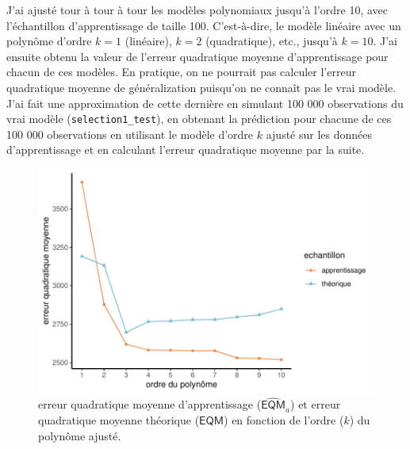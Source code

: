 \documentclass[
  11pt,
  letterpaper,
]{scrbook}
\theoremstyle{definition}
\theoremstyle{remark}
\begin{document}
J'ai ajusté tour à tour à tour les modèles polynomiaux jusqu'à l'ordre
10, avec l'échantillon d'apprentissage de taille 100. C'est-à-dire, le
modèle linéaire avec un polynôme d'ordre \(k=1\) (linéaire), \(k=2\)
(quadratique), etc., jusqu'à \(k=10\). J'ai ensuite obtenu la valeur de
l'erreur quadratique moyenne d'apprentissage pour chacun de ces modèles.
En pratique, on ne pourrait pas calculer l'erreur quadratique moyenne de
généralization puisqu'on ne connaît pas le vrai modèle. J'ai fait une
approximation de cette dernière en simulant 100 000 observations du vrai
modèle (\texttt{selection1\_test}), en obtenant la prédiction pour
chacune de ces 100 000 observations en utilisant le modèle d'ordre \(k\)
ajusté sur les données d'apprentissage et en calculant l'erreur
quadratique moyenne par la suite.

\begin{figure}[ht!]

{\centering \includegraphics[width=1\textwidth,height=\textheight]{selectionmodeles_files/figure-pdf/fig-plotEQMa-1.pdf}

}

\caption{\label{fig-plotEQMa}erreur quadratique moyenne d'apprentissage
(\(\widehat{\mathsf{EQM}}_a\)) et erreur quadratique moyenne théorique
(\(\mathsf{EQM}\)) en fonction de l'ordre (\(k\)) du polynôme ajusté.}

\end{figure}
\end{document}
